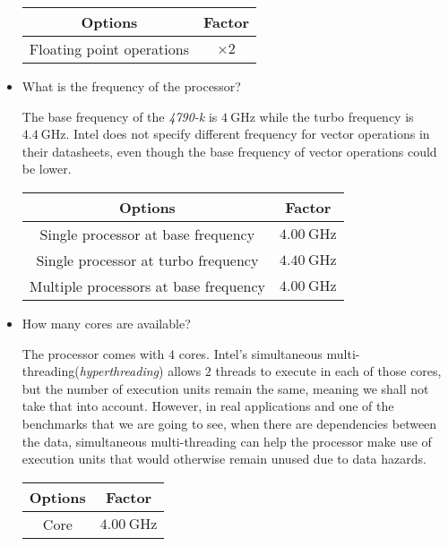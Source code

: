 \documentclass[
    12pt, %
]{fphw}
\begin{document}
\begin{itemize}
    \begin{center}
    \begin{tabular}{c|c}
        \textbf{Options} & \textbf{Factor} \\
        \hline \hline
        Floating point operations & $\times 2$ \\
    \end{tabular}
    \end{center}

    \item What is the frequency of the processor?

    The base frequency of the \textit{4790-k} is $\SI{4}{\GHz}$ while
    the turbo frequency is $\SI{4.4}{\GHz}$.
    Intel does not specify different frequency for vector operations in their datasheets,
    even though the base frequency of vector operations could be lower\footnotemark.

    \begin{center}
    \begin{tabular}{c|c}
        \textbf{Options} & \textbf{Factor} \\
        \hline \hline
        Single processor at base frequency & $\SI{4.00}{\GHz}$ \\
        Single processor at turbo frequency & $\SI{4.40}{\GHz}$ \\
        Multiple processors at base frequency & $\SI{4.00}{\GHz}$
    \end{tabular}
    \end{center}


    \item How many cores are available?

    The processor comes with $4$ cores.
    Intel's simultaneous multi-threading(\textit{hyperthreading}) allows $2$ threads
    to execute in each of those cores,
    but the number of execution units remain the same,
    meaning we shall not take that into account.
    However, in real applications and one of the benchmarks that we are going to see,
    when there are dependencies between the data,
    simultaneous multi-threading can help the processor make use of execution units
    that would otherwise remain unused due to data hazards. %

    \begin{center}
    \begin{tabular}{c|c}
        \textbf{Options} & \textbf{Factor} \\
        \hline \hline
        Core & $\SI{4.00}{\GHz}$ \\
    \end{tabular}
    \end{center}

\end{itemize}
\end{document}
